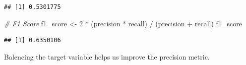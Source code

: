 \documentclass[
  twoside]{article}
\newenvironment{Shaded}{\begin{snugshade}}{\end{snugshade}}
\newcommand{\CommentTok}[1]{\textcolor[rgb]{0.56,0.35,0.01}{\textit{#1}}}
\newcommand{\DecValTok}[1]{\textcolor[rgb]{0.00,0.00,0.81}{#1}}
\newcommand{\NormalTok}[1]{#1}
\newcommand{\OtherTok}[1]{\textcolor[rgb]{0.56,0.35,0.01}{#1}}
\newcommand{\SpecialCharTok}[1]{\textcolor[rgb]{0.00,0.00,0.00}{#1}}
\begin{document}
\begin{verbatim}
## [1] 0.5301775
\end{verbatim}

\begin{Shaded}
\begin{Highlighting}[]
\CommentTok{\# F1 Score}
\NormalTok{f1\_score }\OtherTok{\textless{}{-}} \DecValTok{2} \SpecialCharTok{*}\NormalTok{ (precision }\SpecialCharTok{*}\NormalTok{ recall) }\SpecialCharTok{/}\NormalTok{ (precision }\SpecialCharTok{+}\NormalTok{ recall)}
\NormalTok{f1\_score}
\end{Highlighting}
\end{Shaded}

\begin{verbatim}
## [1] 0.6350106
\end{verbatim}

Balencing the target variable helps us improve the precision metric.
\end{document}
